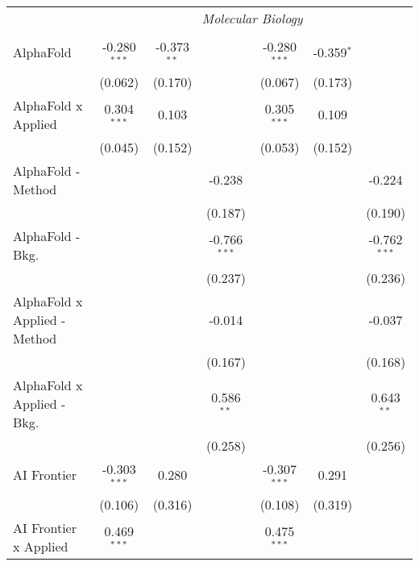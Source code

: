 \begin{tabular}{lcccccc}
 & \multicolumn{6}{c}{\textit{Molecular Biology}} \\ \\
   AlphaFold                    & -0.280$^{***}$ & -0.373$^{**}$ &                & -0.280$^{***}$ & -0.359$^{*}$ &   \\   
                                & (0.062)        & (0.170)       &                & (0.067)        & (0.173)      &   \\   
   AlphaFold x Applied          & 0.304$^{***}$  & 0.103         &                & 0.305$^{***}$  & 0.109        &   \\   
                                & (0.045)        & (0.152)       &                & (0.053)        & (0.152)      &   \\   
   AlphaFold - Method           &                &               & -0.238         &                &              & -0.224\\   
                                &                &               & (0.187)        &                &              & (0.190)\\   
   AlphaFold - Bkg.             &                &               & -0.766$^{***}$ &                &              & -0.762$^{***}$\\   
                                &                &               & (0.237)        &                &              & (0.236)\\   
   AlphaFold x Applied - Method &                &               & -0.014         &                &              & -0.037\\   
                                &                &               & (0.167)        &                &              & (0.168)\\   
   AlphaFold x Applied - Bkg.   &                &               & 0.586$^{**}$   &                &              & 0.643$^{**}$\\   
                                &                &               & (0.258)        &                &              & (0.256)\\   
   AI Frontier                  & -0.303$^{***}$ & 0.280         &                & -0.307$^{***}$ & 0.291        &   \\   
                                & (0.106)        & (0.316)       &                & (0.108)        & (0.319)      &   \\   
   AI Frontier x Applied        & 0.469$^{***}$  &               &                & 0.475$^{***}$  &              &   \\   

\end{tabular}
